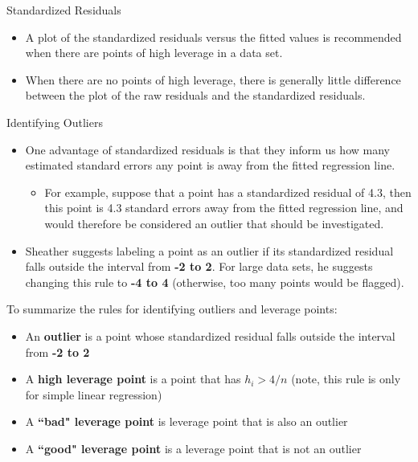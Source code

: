 \documentclass[10pt]{beamer}
\begin{document}
\begin{frame}{Standardized Residuals}
\begin{itemize}
\item A plot of the standardized residuals versus the fitted values is recommended when there are points of high leverage in a data set.\\
\vspace{10pt}
\item When there are no points of high leverage, there is generally little difference between the plot of the raw residuals and the standardized residuals.
\end{itemize}
\end{frame}

\begin{frame}{Identifying Outliers}
\begin{itemize}
\item One advantage of standardized residuals is that they inform us how many estimated standard errors any point is away from the fitted regression line. 
\begin{itemize}
\item For example, suppose that a point has a standardized residual of 4.3, then this point is 4.3 standard errors away from the fitted regression line, and would therefore be considered an outlier that should be investigated.\\
\end{itemize}
\vspace{5pt}
\item Sheather suggests labeling a point as an outlier if its standardized residual falls outside the interval from \textbf{-2 to 2}.  For large data sets, he suggests changing this rule to \textbf{-4 to 4} (otherwise, too many points would be flagged).
\end{itemize}
\end{frame}

\begin{frame}
To summarize the rules for identifying outliers and leverage points:
\vspace{5pt}
\begin{itemize}
\item An \textbf{outlier} is a point whose standardized residual falls outside the interval from \textbf{-2 to 2}
\vspace{5pt}
\item A \textbf{high leverage point} is a point that has $h_i > 4/n$ (note, this rule is only for simple linear regression)
\vspace{5pt}
\item A \textbf{``bad" leverage point} is leverage point that is also an outlier
\vspace{5pt}
\item A \textbf{``good" leverage point} is a leverage point that is not an outlier
\end{itemize}
\end{frame}
\end{document}
